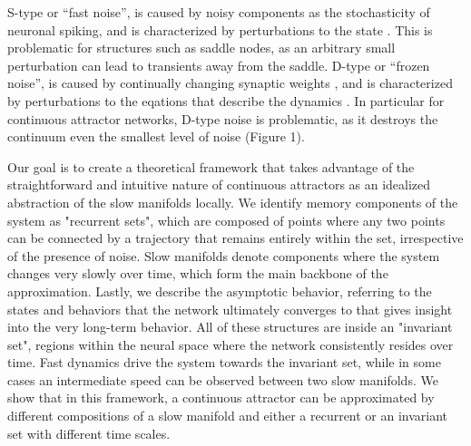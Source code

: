 \documentclass[12pt,letterpaper, onecolumn]{article}
\theoremstyle{definition}
\theoremstyle{remark}
\begin{document}
S-type or ``fast noise'', is caused by noisy components as the stochasticity of neuronal spiking, and is characterized by perturbations to the state \citep{panichello2019, burak2012}.
This is problematic for structures such as saddle nodes, as an arbitrary small perturbation can lead to transients away from the saddle.
D-type or  ``frozen noise'', is caused by continually changing synaptic weights \citep{flesch2023continual}, and is characterized by perturbations to the eqations that describe the dynamics \citep{seeholzer2019, laje2013, flesch2022}.
In particular for continuous attractor networks, D-type noise is problematic, as it destroys the continuum even the smallest level of noise (Figure 1). %


Our goal is to create a theoretical framework that takes advantage of the straightforward and intuitive nature of continuous attractors as an idealized abstraction of the slow manifolds locally.
We identify memory components of the system as "recurrent sets", which are composed of points where any two points can be connected by a trajectory that remains entirely within the set, irrespective of the presence of noise.
Slow manifolds denote components where the system changes very slowly over time, which form the main backbone of the approximation.
Lastly, we describe the asymptotic behavior, referring to the states and behaviors that the network ultimately converges to that gives insight into the very long-term behavior.
All of these structures are inside an "invariant set", regions within the neural space where the network consistently resides over time.
Fast dynamics drive the system towards the invariant set, while in some cases an intermediate speed can be observed between two slow manifolds.
We show that in this framework, a continuous attractor can be approximated by different compositions of a slow manifold and either a recurrent or an invariant set with different time scales.
\end{document}
